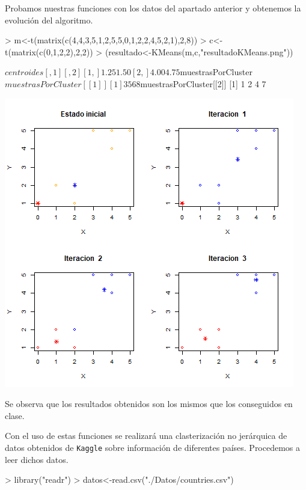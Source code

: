 \documentclass [a4paper] {article}
\begin{document}
\bigskip
Probamos nuestras funciones con los datos del apartado anterior y obtenemos la evolución del algoritmo.
\begin{Schunk}
\begin{Sinput}
> m<-t(matrix(c(4,4,3,5,1,2,5,5,0,1,2,2,4,5,2,1),2,8))
> c<-t(matrix(c(0,1,2,2),2,2))
> (resultado<-KMeans(m,c,"resultadoKMeans.png"))
\end{Sinput}
\begin{Soutput}
$centroides
     [,1] [,2]
[1,] 1.25 1.50
[2,] 4.00 4.75

$muestrasPorCluster
$muestrasPorCluster[[1]]
[1] 3 5 6 8

$muestrasPorCluster[[2]]
[1] 1 2 4 7
\end{Soutput}
\end{Schunk}
\includegraphics[width=\textwidth]{resultadoKMeans}

\bigskip
Se observa que los resultados obtenidos son los mismos que los conseguidos en clase.

\bigskip
Con el uso de estas funciones se realizará una clasterización no jerárquica de datos obtenidos de \texttt{Kaggle}
sobre información de diferentes países. Procedemos a leer dichos datos.

\bigskip
\begin{Schunk}
\begin{Sinput}
> library("readr")
> datos<-read.csv("./Datos/countries.csv")
\end{Sinput}
\end{Schunk}
\end{document}
